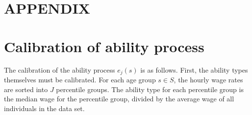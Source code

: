 \documentclass[letterpaper,12pt]{article}
\theoremstyle{definition}
\begin{document}
\begin{spacing}{1.5}







\clearpage
\end{spacing}

\newpage
\renewcommand{\theequation}{A.\arabic{section}.\arabic{equation}}
\renewcommand{\thesection}{A-\arabic{section}}   %
\setcounter{equation}{0}                         %
\setcounter{section}{0}                          %
\section*{APPENDIX}                              %

\section{Calibration of ability process}\label{AppAbilCalib}

  The calibration of the ability process $e_j(s)$ is as follows.  First, the ability types themselves must be calibrated. For each age group $s \in S$, the hourly wage rates are sorted into $J$ percentile groups.  The ability type for each percentile group is the median wage for the percentile group, divided by the average wage of all individuals in the data set.
\end{document}
